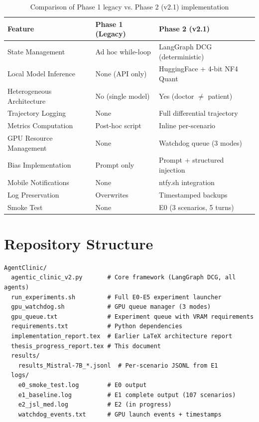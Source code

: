 \documentclass[12pt, a4paper]{article}
\begin{document}
\begin{table}[H]
\centering
\caption{Comparison of Phase 1 legacy vs. Phase 2 (v2.1) implementation}
\begin{tabular}{@{}p{5cm}p{4.5cm}p{4.5cm}@{}}
\toprule
\textbf{Feature} & \textbf{Phase 1 (Legacy)} & \textbf{Phase 2 (v2.1)} \\
\midrule
State Management          & Ad hoc while-loop        & LangGraph DCG (deterministic) \\
Local Model Inference     & None (API only)          & HuggingFace + 4-bit NF4 Quant \\
Heterogeneous Architecture & No (single model)       & Yes (doctor $\neq$ patient) \\
Trajectory Logging        & None                     & Full differential trajectory \\
Metrics Computation       & Post-hoc script          & Inline per-scenario \\
GPU Resource Management   & None                     & Watchdog queue (3 modes) \\
Bias Implementation       & Prompt only              & Prompt + structured injection \\
Mobile Notifications      & None                     & ntfy.sh integration \\
Log Preservation          & Overwrites               & Timestamped backups \\
Smoke Test                & None                     & E0 (3 scenarios, 5 turns) \\
\bottomrule
\end{tabular}
\end{table}

\section{Repository Structure}

\begin{lstlisting}[style=bashstyle]
AgentClinic/
  agentic_clinic_v2.py       # Core framework (LangGraph DCG, all agents)
  run_experiments.sh         # Full E0-E5 experiment launcher
  gpu_watchdog.sh            # GPU queue manager (3 modes)
  gpu_queue.txt              # Experiment queue with VRAM requirements
  requirements.txt           # Python dependencies
  implementation_report.tex  # Earlier LaTeX architecture report
  thesis_progress_report.tex # This document
  results/
    results_Mistral-7B_*.jsonl  # Per-scenario JSONL from E1
  logs/
    e0_smoke_test.log        # E0 output
    e1_baseline.log          # E1 complete output (107 scenarios)
    e2_jsl_med.log           # E2 (in progress)
    watchdog_events.txt      # GPU launch events + timestamps
\end{lstlisting}
\end{document}
